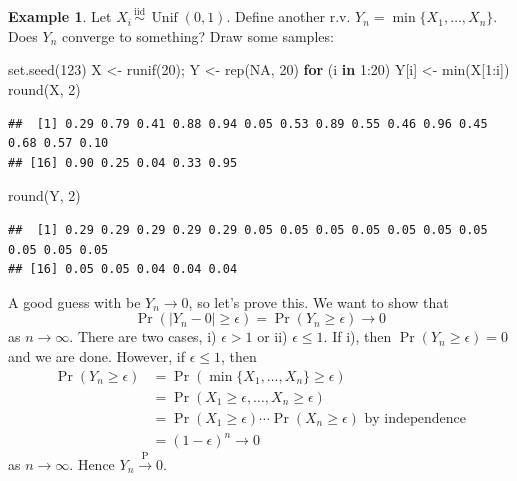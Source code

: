 \documentclass[
]{book}
\newenvironment{Shaded}{\begin{snugshade}}{\end{snugshade}}
\newcommand{\ConstantTok}[1]{\textcolor[rgb]{0.00,0.00,0.00}{#1}}
\newcommand{\ControlFlowTok}[1]{\textcolor[rgb]{0.13,0.29,0.53}{\textbf{#1}}}
\newcommand{\DecValTok}[1]{\textcolor[rgb]{0.00,0.00,0.81}{#1}}
\newcommand{\FunctionTok}[1]{\textcolor[rgb]{0.00,0.00,0.00}{#1}}
\newcommand{\NormalTok}[1]{#1}
\newcommand{\OtherTok}[1]{\textcolor[rgb]{0.56,0.35,0.01}{#1}}
\newcommand{\SpecialCharTok}[1]{\textcolor[rgb]{0.00,0.00,0.00}{#1}}
\DeclareMathOperator{\Unif}{Unif}
\newcommand{\iid}{\,\overset{\text{iid}}{\sim}\,}
\theoremstyle{definition}
\theoremstyle{definition}
\newtheorem{example}{Example}[chapter]
\theoremstyle{definition}
\theoremstyle{definition}
\theoremstyle{remark}
\begin{document}
\begin{example}
Let \(X_i\iid \Unif(0,1)\). Define another r.v. \(Y_n=\min\{X_1,\dots,X_n\}\). Does \(Y_n\) converge to something? Draw some samples:

\begin{Shaded}
\begin{Highlighting}[]
\FunctionTok{set.seed}\NormalTok{(}\DecValTok{123}\NormalTok{)}
\NormalTok{X }\OtherTok{\textless{}{-}} \FunctionTok{runif}\NormalTok{(}\DecValTok{20}\NormalTok{); Y }\OtherTok{\textless{}{-}} \FunctionTok{rep}\NormalTok{(}\ConstantTok{NA}\NormalTok{, }\DecValTok{20}\NormalTok{)}
\ControlFlowTok{for}\NormalTok{ (i }\ControlFlowTok{in} \DecValTok{1}\SpecialCharTok{:}\DecValTok{20}\NormalTok{) Y[i] }\OtherTok{\textless{}{-}} \FunctionTok{min}\NormalTok{(X[}\DecValTok{1}\SpecialCharTok{:}\NormalTok{i]) }
\FunctionTok{round}\NormalTok{(X, }\DecValTok{2}\NormalTok{)}
\end{Highlighting}
\end{Shaded}

\begin{verbatim}
##  [1] 0.29 0.79 0.41 0.88 0.94 0.05 0.53 0.89 0.55 0.46 0.96 0.45 0.68 0.57 0.10
## [16] 0.90 0.25 0.04 0.33 0.95
\end{verbatim}

\begin{Shaded}
\begin{Highlighting}[]
\FunctionTok{round}\NormalTok{(Y, }\DecValTok{2}\NormalTok{)}
\end{Highlighting}
\end{Shaded}

\begin{verbatim}
##  [1] 0.29 0.29 0.29 0.29 0.29 0.05 0.05 0.05 0.05 0.05 0.05 0.05 0.05 0.05 0.05
## [16] 0.05 0.05 0.04 0.04 0.04
\end{verbatim}

A good guess with be \(Y_n \to 0\), so let's prove this.
We want to show that
\[\Pr(|Y_n-0| \geq \epsilon)=\Pr(Y_n\geq \epsilon)\to 0\]
as \(n\to \infty\). There are two cases, i) \(\epsilon > 1\) or ii) \(\epsilon \leq 1\). If i), then \(\Pr(Y_n\geq \epsilon)=0\) and we are done. However, if \(\epsilon \leq 1\), then
\[
\begin{aligned}
\Pr(Y_n\geq \epsilon) 
&= \Pr(\min\{X_1,\dots,X_n\} \geq \epsilon) \\
&=\Pr(X_1 \geq \epsilon, \dots, X_n \geq \epsilon) \\
&=\Pr(X_1\geq \epsilon)\cdots \Pr(X_n\geq \epsilon) \text{ by independence}\\
&=(1-\epsilon)^n \to 0
\end{aligned}
\]
as \(n\to \infty\). Hence \(Y_n \xrightarrow{\text{P}} 0\).
\end{example}
\end{document}

